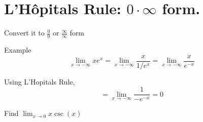 \section*{L'H\^opitals Rule: $0\cdot\infty$ form.}

Convert it to $\frac{0}{0}$ or $\frac{\infty}{\infty}$ form

Example
$$\lim_{x\to-\infty} xe^{x}=\lim_{x\to-\infty} \frac{x}{1/e^{x}}=\lim_{x\to-\infty}\frac{x}{e^{-x}}$$

Using L'Hopitals Rule,
$$=\lim_{x\to-\infty}\frac{1}{-e^{-x}}=0$$


\begin{questions}
\question
Find $\displaystyle{\lim_{x\to 0} x\csc(x)}$
\end{questions}
